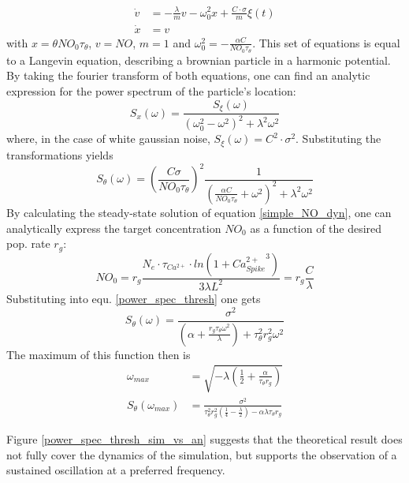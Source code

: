 \documentclass[10pt,a4paper]{article}
\begin{document}
\begin{align}
\dot{v} &= -\frac{\lambda}{m} v - \omega_0^2 x + \frac{C\cdot \sigma}{m} \xi (t) \label{langevin_v} \\
\dot{x} &= v \label{langevin_x}
\end{align}
with $x=\theta NO_0 \tau_{\theta}$, $v=NO$, $m=1$ and $\omega_0^2 =-\frac{\alpha C}{NO_0 \tau_{\theta}}$. This set of equations is equal to a Langevin equation, describing a brownian particle in a harmonic potential. By taking the fourier transform of both equations, one can find an analytic expression for the power spectrum of the particle's location:
\begin{equation}
S_x (\omega) = \frac{S_\xi (\omega)}{(\omega_0^2 - \omega^2)^2 + \lambda^2 \omega^2} \label{power_spec_part}
\end{equation}
where, in the case of white gaussian noise, $S_\xi(\omega)=C^2 \cdot \sigma^2$. Substituting the transformations yields
\begin{equation}
S_\theta (\omega) = \left( \frac{C \sigma}{NO_0 \tau_\theta}\right)^2 \frac{1}{(\frac{\alpha C}{NO_0 \tau_\theta} + \omega^2)^2 + \lambda^2 \omega^2} \label{power_spec_thresh}
\end{equation}
By calculating the steady-state solution of equation \eqref{simple_NO_dyn}, one can analytically express the target concentration $NO_0$ as a function of the desired pop. rate $r_g$:
\begin{equation}
NO_0=r_g \frac{N_e \cdot \tau_{Ca^{2+}} \cdot ln(1+{Ca_{Spike}^{2+}}^3)}{3\lambda L^2} = r_g \frac{C}{\lambda}
\label{NO_analytic}
\end{equation} 
Substituting into equ. \eqref{power_spec_thresh} one gets
\begin{equation}
S_\theta (\omega) = \frac{\sigma^2}{(\alpha+\frac{r_g \tau_\theta \omega^2}{\lambda})+\tau_\theta^2 r_g^2 \omega^2}
\label{power_spec_thresh_r_g}
\end{equation}
The maximum of this function then is
\begin{align}
\omega_{max} &= \sqrt{-\lambda(\frac{1}{2}+\frac{\alpha}{\tau_\theta r_g})} \label{max_omega}\\
S_\theta(\omega_{max}) &= \frac{\sigma^2}{\tau _\theta^2 r_g^2 \left(\frac{1}{4}-\frac{\lambda}{2}\right)-\alpha \lambda \tau _\theta r_g} \label{S_max_omega}
\end{align}

Figure \ref{power_spec_thresh_sim_vs_an} suggests that the theoretical result does not fully cover the dynamics of the simulation, but supports the observation of a sustained oscillation at a preferred frequency.
\end{document}
